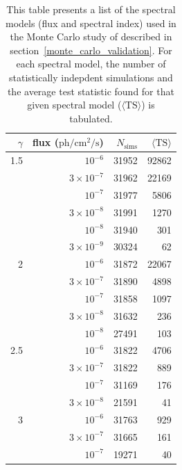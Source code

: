 \documentclass[12pt,preprint]{aastex}
\newcommand{\s}{\text{s}\xspace}
\newcommand{\ph}{\text{ph}\xspace}
\newcommand{\cm}{\text{cm}\xspace}
\newcommand{\ts}{\text{TS}\xspace}
\newcommand{\pointlike}{\text{\em pointlike}\xspace}
\begin{document}
\begin{table}
  \begin{centering}
    \begin{tabular}{ r | r | r | r }
      \hline
      \hline
      $\gamma$ & flux ($\ph/\cm^2/\s$) & $N_\text{sims}$ & $\langle\ts\rangle$ \\
      \hline
      1.5 &          $10^{-6}$ &           31952 &  92862 \\
      &  $3\times 10^{-7}$ &           31962 &  22169 \\
      &          $10^{-7}$ &           31977 &   5806 \\
      &  $3\times 10^{-8}$ &           31991 &   1270 \\
      &          $10^{-8}$ &           31940 &    301 \\
      &  $3\times 10^{-9}$ &           30324 &     62 \\
      \hline
      2 &          $10^{-6}$ &           31872 &  22067 \\
      &  $3\times 10^{-7}$ &           31890 &   4898 \\
      &          $10^{-7}$ &           31858 &   1097 \\
      &  $3\times 10^{-8}$ &           31632 &    236 \\
      &          $10^{-8}$ &           27491 &    103 \\
      \hline
      2.5 &          $10^{-6}$ &           31822 &   4706 \\
      &  $3\times 10^{-7}$ &           31822 &    889 \\
      &          $10^{-7}$ &           31169 &    176 \\
      &  $3\times 10^{-8}$ &           21591 &     41 \\
      \hline                                                
      3 &          $10^{-6}$ &           31763 &    929 \\
      &  $3\times 10^{-7}$ &           31665 &    161 \\
      &          $10^{-7}$ &           19271 &     40 \\
      \hline
    \end{tabular}
    \caption{
    This table presents a list of the spectral models (flux and spectral
    index) used in the Monte Carlo study of \pointlike described in
    section~\ref{monte_carlo_validation}.  For each spectral model, the
    number of statistically indepdent simulations and the average test
    statistic found for that given spectral model ($\langle\ts\rangle$) is tabulated.
}
\end{centering}
\end{table}
\end{document}
